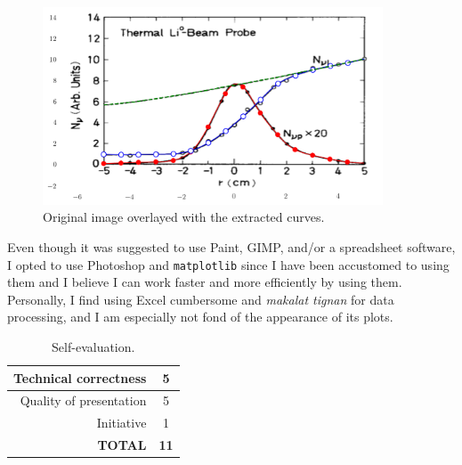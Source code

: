 \documentclass[12pt,a4paper]{article}
\begin{document}
\begin{figure}[!htb]
	\centering
	\includegraphics[width=0.9\textwidth]{final_overlay.png}
	\caption{Original image overlayed with the extracted curves.}	
	\label{fig:output}
\end{figure}

Even though it was suggested to use Paint, GIMP, and/or a spreadsheet software, I opted to use Photoshop and \texttt{matplotlib} since I have been accustomed to using them and I believe I can work faster and more efficiently by using them. Personally, I find using Excel cumbersome and \textit{makalat tignan} for data processing, and I am especially not fond of the appearance of its plots.

\begin{table}[!htb]
	\centering
	\caption{Self-evaluation.}
	\begin{tabular}{|r|c|}
		\hline
		Technical correctness & 5 \\ \hline
		Quality of presentation & 5 \\ \hline
		Initiative & 1 \\ \hline
		\textbf{TOTAL} & \textbf{11} \\ \hline
	\end{tabular}
	\label{tab:self-eval}
\end{table}




\end{document}
